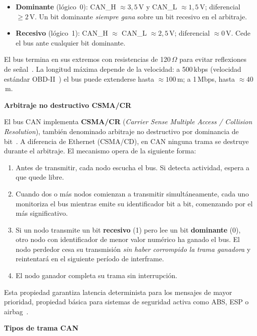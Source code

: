 \begin{itemize}
    \item \textbf{Dominante} (lógico~0): CAN\_H $\approx 3{,}5$\,V y CAN\_L $\approx 1{,}5$\,V; diferencial $\geq 2$\,V. Un bit dominante \emph{siempre gana} sobre un bit recesivo en el arbitraje.
    \item \textbf{Recesivo} (lógico~1): CAN\_H $\approx$ CAN\_L $\approx 2{,}5$\,V; diferencial $\approx 0$\,V. Cede el bus ante cualquier bit dominante.
\end{itemize}

El bus termina en sus extremos con resistencias de 120\,$\Omega$ para evitar reflexiones de señal~\cite{ISO11898-2:2024}. La longitud máxima depende de la velocidad: a 500\,kbps (velocidad estándar OBD-II~\cite{ISO15765-4:2021}) el bus puede extenderse hasta $\approx 100$\,m; a 1\,Mbps, hasta $\approx 40$\,m.

\medskip\noindent\textbf{Arbitraje no destructivo CSMA/CR}

El bus CAN implementa \textbf{CSMA/CR} (\textit{Carrier Sense Multiple Access / Collision Resolution}), también denominado arbitraje no destructivo por dominancia de bit~\cite{ISO11898-1:2024}. A diferencia de Ethernet (CSMA/CD), en CAN ninguna trama se destruye durante el arbitraje. El mecanismo opera de la siguiente forma:

\begin{enumerate}
    \item Antes de transmitir, cada nodo escucha el bus. Si detecta actividad, espera a que quede libre.
    \item Cuando dos o más nodos comienzan a transmitir simultáneamente, cada uno monitoriza el bus mientras emite su identificador bit a bit, comenzando por el más significativo.
    \item Si un nodo transmite un bit \textbf{recesivo} (1) pero lee un bit \textbf{dominante} (0), otro nodo con identificador de menor valor numérico ha ganado el bus. El nodo perdedor cesa su transmisión \emph{sin haber corrompido la trama ganadora} y reintentará en el siguiente período de interframe.
    \item El nodo ganador completa su trama sin interrupción.
\end{enumerate}

Esta propiedad garantiza latencia determinista para los mensajes de mayor prioridad, propiedad básica para sistemas de seguridad activa como ABS, ESP o airbag~\cite{ISO11898-1:2024}.

\medskip\noindent\textbf{Tipos de trama CAN}

